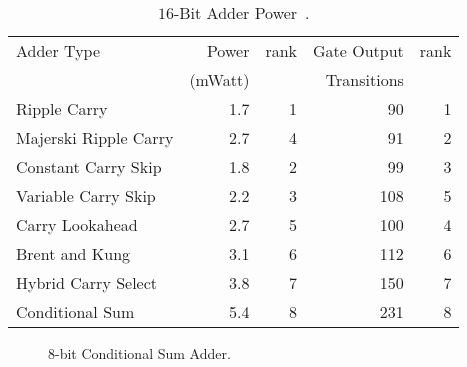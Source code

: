 \documentclass[times, twocolumn, 10pt]{article}
\begin{document}
\begin{center}
\begin{table*}[ht]
  \centering
  \caption{$16$-Bit Adder Power~\cite{378090}.}
  \label{par_add_pow_16_simp}
  \begin{tabular}{||l|r|r|r|r||} \hline
    Adder Type              & Power   & rank & Gate Output & rank \\ 
    & (mWatt) &      & Transitions & \\ \hline
    Ripple Carry            & 1.7 & 1 & 90  & 1 \\ \hline
    Majerski Ripple Carry   & 2.7 & 4 & 91  & 2 \\ \hline
    Constant Carry Skip     & 1.8 & 2 & 99  & 3 \\ \hline
    Variable Carry Skip     & 2.2 & 3 & 108 & 5 \\ \hline
    Carry Lookahead         & 2.7 & 5 & 100 & 4 \\ \hline
    Brent and Kung          & 3.1 & 6 & 112 & 6 \\ \hline
    Hybrid Carry Select            & 3.8 & 7 & 150 & 7 \\ \hline
    Conditional Sum         & 5.4 & 8 & 231 & 8 \\ \hline
  \end{tabular}
\end{table*}
\end{center}
\begin{figure*} [p]
  \begin{center}
    \setlength{\unitlength}{0.0105in}%
  \end{center}
  \label{cond8.fig}
  \caption{8-bit Conditional Sum Adder.}
\end{figure*}



\end{document}

